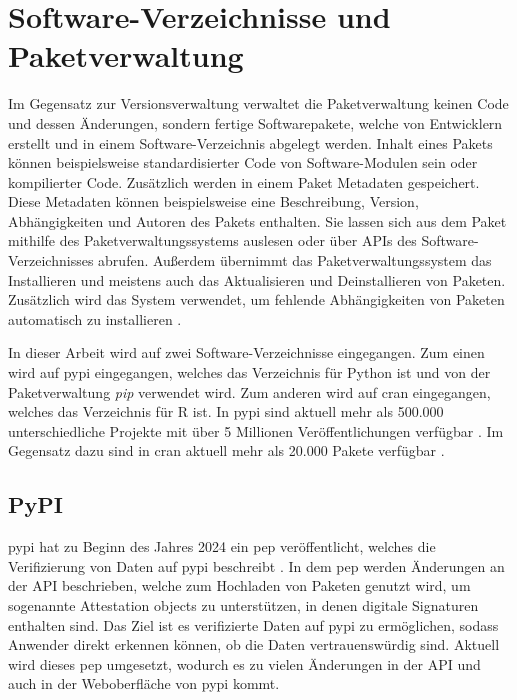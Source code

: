 \section{Software-Verzeichnisse und Paketverwaltung}
\label{sec:paketverwaltung}
Im Gegensatz zur Versionsverwaltung verwaltet die Paketverwaltung keinen Code und dessen Änderungen, sondern fertige Softwarepakete, welche von Entwicklern erstellt und in einem Software-Verzeichnis abgelegt werden.
Inhalt eines Pakets können beispielsweise standardisierter Code von Software-Modulen sein oder kompilierter Code.
Zusätzlich werden in einem Paket Metadaten gespeichert.
Diese Metadaten können beispielsweise eine Beschreibung, Version, Abhängigkeiten und Autoren des Pakets enthalten.
Sie lassen sich aus dem Paket mithilfe des Paketverwaltungssystems auslesen oder über APIs des Software-Verzeichnisses abrufen.
Außerdem übernimmt das Paketverwaltungssystem das Installieren und meistens auch das Aktualisieren und Deinstallieren von Paketen.
Zusätzlich wird das System verwendet, um fehlende Abhängigkeiten von Paketen automatisch zu installieren \autocite{spinellis_package_2012}.

In dieser Arbeit wird auf zwei Software-Verzeichnisse eingegangen.
Zum einen wird auf \gls{pypi} eingegangen, welches das Verzeichnis für Python ist und von der Paketverwaltung \emph{pip} verwendet wird.
Zum anderen wird auf \gls{cran} eingegangen, welches das Verzeichnis für R ist.
In \gls{pypi} sind aktuell mehr als 500.000 unterschiedliche Projekte mit über 5 Millionen Veröffentlichungen verfügbar \autocite{python_software_foundation_pypi_2024}.
Im Gegensatz dazu sind in \gls{cran} aktuell mehr als 20.000 Pakete verfügbar \autocite{cran_team_comprehensive_2024}.

\subsection{PyPI}
\label{subsec:paketverwaltung_pypi}
\gls{pypi} hat zu Beginn des Jahres 2024 ein \gls{pep} veröffentlicht, welches die Verifizierung von Daten auf \gls{pypi} beschreibt \autocite{python_software_foundation_pep_2024}.
In dem \gls{pep} werden Änderungen an der API beschrieben, welche zum Hochladen von Paketen genutzt wird, um sogenannte \glqq Attestation objects \grqq{} zu unterstützen, in denen digitale Signaturen enthalten sind.
Das Ziel ist es verifizierte Daten auf \gls{pypi} zu ermöglichen, sodass Anwender direkt erkennen können, ob die Daten vertrauenswürdig sind.
Aktuell wird dieses \gls{pep} umgesetzt, wodurch es zu vielen Änderungen in der API und auch in der Weboberfläche von \gls{pypi} kommt.

